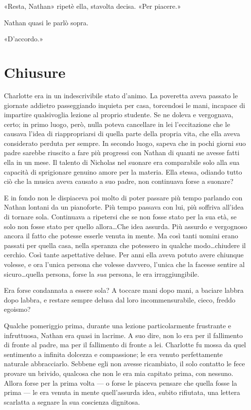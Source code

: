 \documentclass[a4paper,oneside,11pt]{memoir}
\begin{document}
«Resta, Nathan» ripetè ella, stavolta decisa. «Per piacere.»

Nathan quasi le parlò sopra.

«D'accordo.»

\chapter{Chiusure}

Charlotte era in un indescrivibile stato d'animo. La poveretta aveva passato le giornate addietro
passeggiando inquieta per casa, torcendosi le mani, incapace di impartire qualsivoglia lezione al
proprio studente. Se ne doleva e vergognava, certo; in primo luogo, però, nulla poteva cancellare in
lei l'eccitazione che le causava l'idea di riappropriarsi di quella parte della propria vita, che
ella aveva considerato perduta per sempre. In secondo luogo, sapeva che in pochi giorni suo padre
sarebbe riuscito a fare più progressi con Nathan di quanti ne avesse fatti ella in un mese. Il
talento di Nicholas nel suonare era comparabile solo alla sua capacità di sprigionare genuino amore
per la materia. Ella stessa, odiando tutto ciò che la musica aveva causato a suo padre, non
continuava forse a suonare?

E in fondo non le dispiaceva poi molto di poter passare più tempo parlando con Nathan lontani da un
pianoforte. Più tempo passava con lui, più soffriva all'idea di tornare sola. Continuava a ripetersi
che se non fosse stato per la sua età, se solo non fosse stato per quello allora\dots Che idea
assurda. Più assurdo e vergognoso ancora il fatto che potesse esserle venuta in mente. Ma così tanti
uomini erano passati per quella casa, nella speranza che potessero in qualche modo\dots chiudere il
cerchio. Così tante aspettative deluse. Per anni ella aveva potuto avere chiunque volesse, e ora
l'unica persona che volesse davvero, l'unica che la facesse sentire al sicuro\dots quella persona,
forse la \emph{sua} persona, le era irraggiungibile.

Era forse condannata a essere sola? A toccare mani dopo mani, a baciare labbra dopo labbra, e
restare sempre delusa dal loro incommensurabile, cieco, freddo egoismo?

Qualche pomeriggio prima, durante una lezione particolarmente frustrante e infruttuosa, Nathan era
quasi in lacrime. A suo dire, non lo era per il fallimento di fronte al padre, ma per il fallimento
di fronte a lei. Charlotte fu mossa da quel sentimento a infinita dolcezza e compassione; le era
venuto perfettamente naturale abbracciarlo. Sebbene egli non avesse ricambiato, il solo contatto le
fece provare un brivido, qualcosa che non le era mia capitato prima, con nessuno. Allora forse per
la prima volta — o forse le piaceva pensare che quella fosse la prima — le era venuta in mente
quell'assurda idea, subito rifiutata, una lettera scarlatta a segnare la sua coscienza dignitosa.
\end{document}

